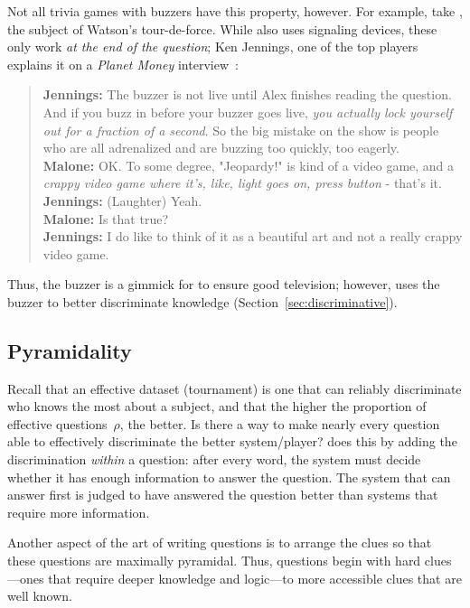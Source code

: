 Not all trivia games with buzzers have this property, however.
For example, take \jeopardy{}, the subject of Watson's tour-de-force.  
While \jeopardy{} also uses signaling devices, these only work \emph{at the end of the question}; Ken Jennings, one of the top \jeopardy{} players explains it on a \textit{Planet Money} interview~\cite{malone-19}:
\begin{quote}
{\bf Jennings:} The buzzer is
    not live until Alex finishes reading the question. And if you buzz
    in before your buzzer goes live, \emph{you actually lock yourself out
    for a fraction of a second}. So the big mistake on the show is
    people who are all adrenalized and are buzzing too quickly, too
    eagerly. \\
{\bf Malone:} OK. To some degree, "Jeopardy!" is kind of a video game, and a \emph{crappy video game where it's, like, light goes on, press button} - that's it. \\
{\bf Jennings:} (Laughter) Yeah. \\
{\bf Malone:} Is that true? \\
{\bf Jennings:} I do like to think of it as a beautiful art and not a really crappy video game.
\end{quote}
Thus, the buzzer is a gimmick for \jeopardy{} to ensure good television; however, \qb{} uses the buzzer to better discriminate knowledge (Section~\ref{sec:discriminative}).

\subsection{Pyramidality}
\label{sec:pyramidality}

Recall that an effective dataset (tournament) is one that can reliably discriminate who knows the most about a subject, and that the higher the proportion of effective questions~$\rho$, the better.
Is there a way to make nearly every question able to effectively discriminate the better system/player?
\qb{} does this by adding the discrimination \emph{within} a question: after every word, the system must decide whether it has enough information to answer the question.
The system that can answer first is judged to have answered the question better than systems that require more information.

Another aspect of the art of writing \qb{} questions is to arrange the clues so that these questions are maximally pyramidal.
Thus, questions begin with hard clues---ones that require deeper knowledge and logic---to more accessible clues that are well known.

